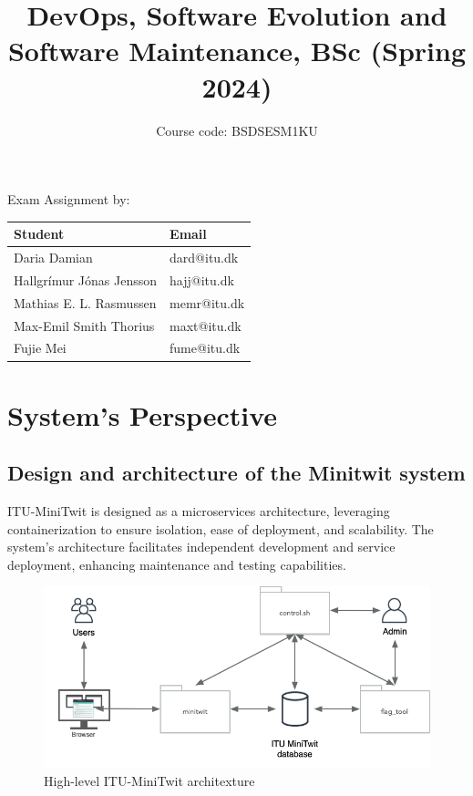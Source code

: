 \documentclass[12pt, a4paper, oneside]{book}
\title{DevOps, Software Evolution and Software Maintenance, BSc (Spring 2024)}
\author{Course code: BSDSESM1KU}
\begin{document}
\begin{spacing}{1.5}

\begin{minipage}{\textwidth}
\maketitle

\begin{center}
    Exam Assignment by: \\
    \hfill \break
    \bgroup
    \def\arraystretch{1.5}%
    \begin{tabularx}{0.8\textwidth} { 
      | >{\centering\arraybackslash}X 
      | >{\centering\arraybackslash}X | }
     \hline
     \cellcolor[HTML]{EFEFEF} Student & \cellcolor[HTML]{EFEFEF} Email \\
     \hline
     Daria Damian & dard@itu.dk \\
     \hline
     Hallgrímur Jónas Jensson & hajj@itu.dk \\
    \hline
     Mathias E. L. Rasmussen & memr@itu.dk \\
    \hline
     Max-Emil Smith Thorius & maxt@itu.dk \\
    \hline
    Fujie Mei & fume@itu.dk \\
    \hline
    \end{tabularx}
    \egroup
\end{center}
\end{minipage}

\tableofcontents

\chapter{System's Perspective}

\section{Design and architecture of the Minitwit system}


ITU-MiniTwit is designed as a microservices architecture, leveraging containerization to ensure isolation, ease of deployment, and scalability. The system's architecture facilitates independent development and service deployment, enhancing maintenance and testing capabilities.
\begin{figure}[h]
    \centering
    \includegraphics[width=\textwidth]{images/ITU-minitwit-architecture.png}
    \caption{High-level ITU-MiniTwit architexture}
\end{figure}\\


\end{spacing}
\end{document}

